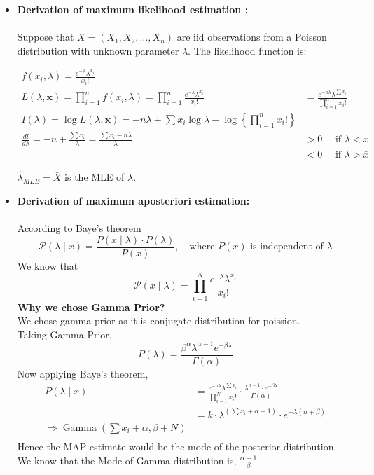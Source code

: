 \documentclass[english,a4paper,12pt]{article}
\begin{document}
\begin{enumerate}
\begin{itemize}
    \item \textbf{Derivation of maximum likelihood estimation :} \\\\
Suppose that $X=\left(X_{1}, X_{2}, \ldots, X_{n}\right)$ are iid observations from a Poisson distribution with unknown parameter $\lambda .$ The likelihood function is:
\begin{center}
$$
\begin{aligned}
f\left(x_{i}, \lambda\right)= \frac{e^{-\lambda} \lambda^{x_{i}}}{x_{i} !} \\
L(\lambda, \boldsymbol{x})=\prod_{i=1}^{n} f\left(x_{i}, \lambda\right)=\prod_{i=1}^{n} \frac{e^{-\lambda} \lambda^{x_{i}}}{x_{i} !} &=\frac{e^{-n \lambda} \lambda^{\sum x_{i}}}{\prod_{i=1}^{n} x_{i} !} \\
I(\lambda)=\log L(\lambda, \boldsymbol{x})=-n \lambda+\sum x_{i} \log \lambda-\log \left\{\prod_{i=1}^{n} x_{i} !\right\} \\
\frac{d l}{d \lambda}=-n+\frac{\sum x_{i}}{\lambda}=\frac{\sum x_{i}-n \lambda}{\lambda} &>0 \quad \text { if } \lambda<\bar{x} \\
&<0 \quad \text { if } \lambda>\bar{x}
\end{aligned}
$$
\end{center}

 $\hat{\lambda}_{MLE}=\bar{X}$ is the $\mathrm{MLE}$ of $\lambda$.
 
\newpage

\item \textbf{Derivation of maximum aposteriori estimation:}\\\\
According to Baye's theorem
$$
\mathcal{P}(\lambda \mid x)=\frac{P(x \mid \lambda) \cdot P(\lambda)}{P\left(x\right)},\quad \text{where } P(x) \text{ is independent of } \lambda
$$
We know that
$$
\mathcal{P}(x \mid \lambda)=\prod_{i=1}^{N} \frac{e^{-\lambda}{\lambda}^{x_i}}{{x_{i} !} }
$$
\textbf{Why we chose Gamma Prior?}\\
We chose gamma prior as it is conjugate distribution for poission.\\
Taking Gamma Prior,
$$
P(\lambda)=\frac{\beta^{\alpha} \lambda^{\alpha-1} e^{-\beta \lambda}}{\Gamma(\alpha)}
$$
Now applying Baye's theorem, \\
$$
\begin{aligned}
P(\lambda \mid x) &=\frac{e^{-n \lambda} \lambda^{\sum x_{i}}}{\prod_{i=1}^{N} x_{i} !} \cdot \frac{\lambda^{\alpha-1} \cdot e^{-\beta \lambda}}{\Gamma(\alpha)} \\
&=k \cdot \lambda^{(\sum x_{i}+\alpha-1)} \cdot e^{-\lambda(n+\beta)} \\
\Rightarrow \operatorname{Gamma}(\sum x_{i}+\alpha, \beta+N) \\
\end{aligned}
$$
Hence the MAP estimate would be the mode of the posterior distribution. \\
We know that the Mode of Gamma distribution is, $\frac{\alpha -1}{\beta}$


\end{itemize}
\end{enumerate}
\end{document}
